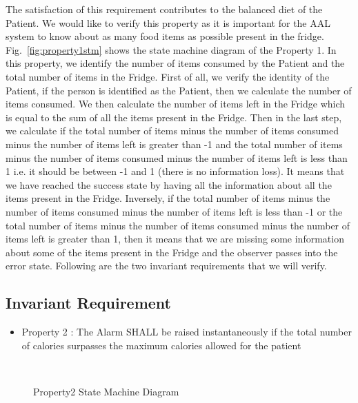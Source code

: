 \documentclass[a4paper,twoside]{article}
\begin{document}
The satisfaction of this requirement contributes to the balanced diet of the Patient. We would like to verify this property as it is important for the AAL system to know about as many food items as possible present in the fridge. 
Fig.~\ref{fig:property1stm} shows the state machine diagram of the Property 1. In this property, we identify the number of items consumed by the Patient and the total number of items in the Fridge. First of all, we verify the identity of the Patient, if the person is identified as the Patient, then we calculate the number of items consumed. We then calculate the number of items left in the Fridge which is equal to the sum of all the items present in the Fridge. Then in the last step, we calculate if the total number of items minus the number of items consumed minus the number of items left is greater than -1 and the total number of items minus the number of items consumed minus the number of items left is less than 1 i.e. it should be between -1 and 1 (there is no information loss). It means that we have reached the success state by having all the information about all the items present in the Fridge. Inversely, if the total number of items minus the number of items consumed minus the number of items left is less than -1 or the total number of items minus the number of items consumed minus the number of items left is greater than 1, then it means that we are missing some information about some of the items present in the Fridge and the observer passes into the error state.
Following are the two invariant requirements that we will verify.

\subsection{Invariant Requirement}


\begin{itemize}
\item Property 2 : The Alarm SHALL be raised instantaneously if the total number of calories surpasses the maximum calories allowed for the patient 
\end{itemize}



\begin{figure}[!h]
  \vspace{8cm}~
  \centering
  {}
  \caption{Property2 State Machine Diagram}
  \label{fig:property3stm}
 \end{figure}
\end{document}
